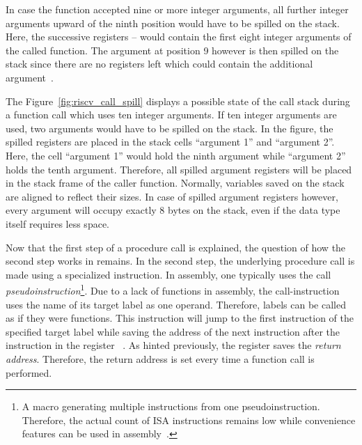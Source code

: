 In case the function accepted nine or more integer arguments,
all further integer arguments upward of the ninth position would have to be spilled on the stack.
Here, the successive registers -- would contain the first eight integer arguments of the called function.
The argument at position 9 however is then spilled on the stack since there are no registers left which could contain the additional argument~\cite[p.~8]{RiscvABI2022}.

The Figure~\ref{fig:riscv_call_spill} displays a possible state of the call stack during a function call which uses ten integer arguments.
If ten integer arguments are used, two arguments would have to be spilled on the stack.
In the figure, the spilled registers are placed in the stack cells \enquote{argument 1} and \enquote{argument 2}.
Here, the cell \enquote{argument 1} would hold the ninth argument while \enquote{argument 2} holds the tenth argument.
Therefore, all spilled argument registers will be placed in the stack frame of the caller function.
Normally, variables saved on the stack are aligned to reflect their sizes.
In case of spilled argument registers however, every argument will occupy exactly 8 bytes on the stack, even if the data type itself requires less space.

Now that the first step of a procedure call is explained, the question of how the second step works in \riscv{} remains.
In the second step, the underlying procedure call is made using a specialized instruction.
In \riscv{} assembly, one typically uses the call \emph{pseudoinstruction}\footnote{A macro generating multiple instructions from one pseudoinstruction. Therefore, the actual count of ISA instructions remains low while convenience features can be used in assembly~\cite[p.~68]{Dandamudi2005}.}.
Due to a lack of functions in assembly, the call-instruction uses the name of its target label as one operand.
Therefore, labels can be called as if they were functions.
This instruction will jump to the first instruction of the specified target label while saving the address of the next instruction after the  instruction in the register ~\cite[p.~22]{Patterson2017}.
As hinted previously, the  register saves the \emph{return address}.
Therefore, the return address is set every time a function call is performed.

